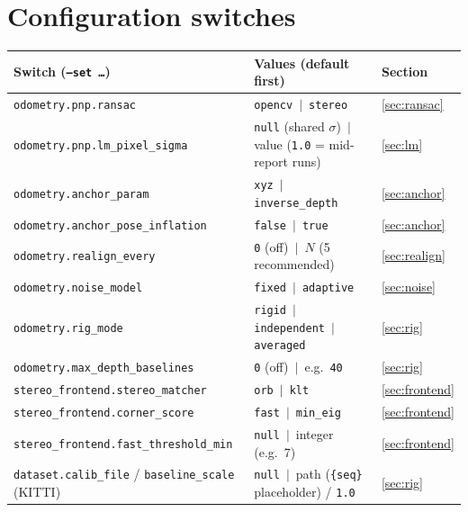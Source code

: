 \documentclass[11pt,a4paper]{article}
\begin{document}
\section{Configuration switches}\label{app:config}
\begin{table}[H]
\centering\scriptsize
\begin{tabular}{lll}
\toprule
Switch (\texttt{--set \ldots}) & Values (default first) & Section \\
\midrule
\texttt{odometry.pnp.ransac} & \texttt{opencv} \,$|$\, \texttt{stereo} & \ref{sec:ransac} \\
\texttt{odometry.pnp.lm\_pixel\_sigma} & \texttt{null} (shared $\sigma$) \,$|$\, value (\texttt{1.0} = mid-report runs) & \ref{sec:lm} \\
\texttt{odometry.anchor\_param} & \texttt{xyz} \,$|$\, \texttt{inverse\_depth} & \ref{sec:anchor} \\
\texttt{odometry.anchor\_pose\_inflation} & \texttt{false} \,$|$\, \texttt{true} & \ref{sec:anchor} \\
\texttt{odometry.realign\_every} & \texttt{0} (off) \,$|$\, $N$ (5 recommended) & \ref{sec:realign} \\
\texttt{odometry.noise\_model} & \texttt{fixed} \,$|$\, \texttt{adaptive} & \ref{sec:noise} \\
\texttt{odometry.rig\_mode} & \texttt{rigid} \,$|$\, \texttt{independent} \,$|$\, \texttt{averaged} & \ref{sec:rig} \\
\texttt{odometry.max\_depth\_baselines} & \texttt{0} (off) \,$|$\, e.g.\ \texttt{40} & \ref{sec:rig} \\
\texttt{stereo\_frontend.stereo\_matcher} & \texttt{orb} \,$|$\, \texttt{klt} & \ref{sec:frontend} \\
\texttt{stereo\_frontend.corner\_score} & \texttt{fast} \,$|$\, \texttt{min\_eig} & \ref{sec:frontend} \\
\texttt{stereo\_frontend.fast\_threshold\_min} & \texttt{null} \,$|$\, integer (e.g.\ 7) & \ref{sec:frontend} \\
\texttt{dataset.calib\_file} / \texttt{baseline\_scale} (KITTI) & \texttt{null} \,$|$\, path (\texttt{\{seq\}} placeholder) / \texttt{1.0} & \ref{sec:rig} \\
\bottomrule
\end{tabular}
\end{table}
\vspace{-0.3cm}
\end{document}

